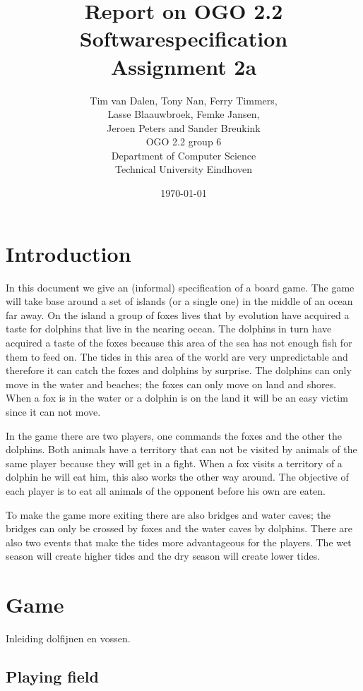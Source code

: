\documentclass[12pt]{article}
\title{Report on OGO 2.2 Softwarespecification\\ Assignment 2a}
\author{
        Tim van Dalen, Tony Nan, Ferry Timmers, \\ Lasse Blaauwbroek, Femke Jansen, \\Jeroen Peters and Sander Breukink\\ OGO 2.2 group 6 \\
                Department of Computer Science\\
        Technical University Eindhoven\\
}
\date{\today}
\begin{document}
\maketitle

\begin{abstract}
\end{abstract}

\section{Introduction}

In this document we give an (informal) specification of a board game.
The game will take base around a set of islands (or a single one)
in the middle of an ocean far away. On the island a group of foxes
lives that by evolution have acquired a taste for dolphins that live
in the nearing ocean. The dolphins in turn have acquired a taste of
the foxes because this area of the sea has not enough fish for them
to feed on. The tides in this area of the world are very unpredictable
and therefore it can catch the foxes and dolphins by surprise. The
dolphins can only move in the water and beaches; the foxes can only
move on land and shores. When a fox is in the water or a dolphin is
on the land it will be an easy victim since it can not move.

In the game there are two players, one commands the foxes and the
other the dolphins. Both animals have a territory that can not be
visited by animals of the same player because they will get in a fight.
When a fox visits a territory of a dolphin he will eat him, this also
works the other way around. The objective of each player is to eat
all animals of the opponent before his own are eaten.

To make the game more exiting there are also bridges and water caves;
the bridges can only be crossed by foxes and the water caves by dolphins.
There are also two events that make the tides more advantageous for
the players. The wet season will create higher tides and the dry season
will create lower tides.

\section{Game}

Inleiding dolfijnen en vossen.

\subsection{Playing field}
\end{document}
